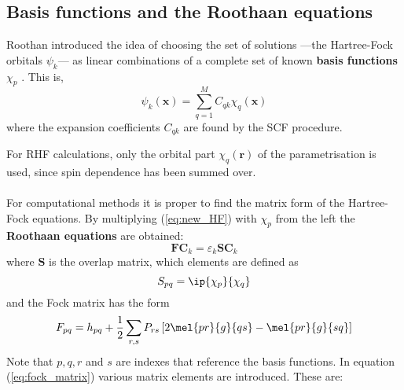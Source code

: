 \subsection{Basis functions and the Roothaan equations}
Roothan introduced the idea of choosing the set of solutions ---the Hartree-Fock orbitals $\psi_k$--- as linear combinations of a complete set of known \textbf{basis functions} $\chi_p$ \cite{roothaan}. This is,
\begin{equation}
	\psi_k(\mathbf{x}) = \sum_{q=1}^M C_{qk}\chi_q(\mathbf{x})
	\label{eq:basis_functions}
\end{equation}
where the expansion coefficients $C_{qk}$ are found by the SCF procedure.

For RHF calculations, only the orbital part $\chi_q (\mathbf{r}) $ of the parametrisation is used, since spin dependence has been summed over.\\\\
For computational methods it is proper to find the matrix form of the Hartree-Fock equations. By multiplying (\ref{eq:new_HF}) with $\chi_p$ from the left the \textbf{Roothaan equations} are obtained:
\begin{equation}
	\mathbf{F}\mathbf{C}_k = \varepsilon_k\mathbf{S}\mathbf{C}_k
	\label{eq:roothaan_equation}
\end{equation}
where $\mathbf{S}$ is the overlap matrix, which elements are defined as
\begin{equation}
	S_{pq}=\ip{\chi_p}{\chi_q}
\end{equation}
and the Fock matrix has the form
\begin{equation}
	F_{pq} = h_{pq}+\frac{1}{2}\sum_{r,s}P_{rs}\left[2\mel{pr}{g}{qs}-\mel{pr}{g}{sq}\right]
	\label{eq:fock_matrix}
\end{equation}
Note that $p,q,r$ and $s$ are indexes that reference the basis functions. In equation (\ref{eq:fock_matrix}) various matrix elements are introduced. These are:
